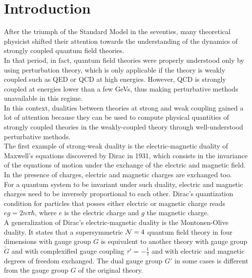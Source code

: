 \cleardoublepage
\chapter{ \bfseries Introduction}
After the triumph of the Standard Model in the seventies, many theoretical physicist shifted their attention towards the understanding of the dynamics of strongly coupled quantum field theories. \\
In that period, in fact, quantum field theories were properly understood only by using perturbation theory, which is only applicable if the theory is weakly coupled such as QED or QCD at high energies.
However, QCD is strongly coupled at energies lower than a few GeVs, thus making perturbative methods unavailable in this regime.
\\
In this context, dualities between theories at strong and weak coupling gained a lot of attention because they can be used to compute physical quantities of strongly coupled theories in the weakly-coupled theory through well-understood perturbative methods.
\\

The first example of strong-weak duality is the electric-magnetic duality of Maxwell's equations discovered by Dirac in 1931, which consists in the invariance of the equations of motion under the exchange of the electric and magnetic field. 
In the presence of charges, electric and magnetic charges are exchanged too. \\
For a quantum system to be invariant under such duality, electric and magnetic charges need to be inversely proportional to each other. 
Dirac's quantization condition for particles that posses either electric or magnetic charge reads $e g =  2 n \pi \hbar$, where $e$ is the electric charge and $g$ the magnetic charge.
\\

A generalization of Dirac's electric-magnetic duality is the Montonen-Olive duality.
It states that a supersymmetric  $\mathcal{N}=4$ quantum field theory in four dimensions with gauge group $G$ is equivalent to another theory with gauge group $\tilde{G}$ and with complexified gauge coupling $\tau' = - \frac{1}{\tau}$ and with electric and magnetic degrees of freedom exchanged.
The dual gauge group $G'$ in some cases is different from the gauge group $G$ of the original theory.
\\

